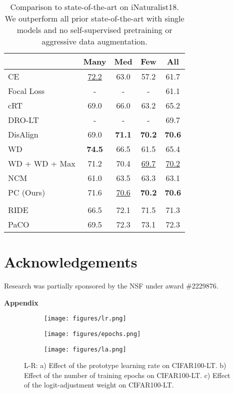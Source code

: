 \documentclass{article}
\begin{document}
\begin{table}[h!]
  \centering
  \begin{tabular}{l c c c c }
    \toprule
      & Many & Med & Few & All \\
    \midrule
    CE & \underline{72.2} & 63.0 & 57.2 & 61.7 \\
    Focal Loss  & - & - & - & 61.1 \\
    cRT  & 69.0 & 66.0 & 63.2 & 65.2 \\
    DRO-LT  & - & - & - & 69.7 \\
    DisAlign & 69.0 & \textbf{71.1} & \textbf{70.2} & \textbf{70.6} \\
    WD & \textbf{74.5} & 66.5 & 61.5 & 65.4 \\
    WD + WD + Max  & 71.2 & 70.4 & \underline{69.7} & \underline{70.2} \\
    \midrule
    NCM & 61.0 & 63.5 & 63.3 & 63.1 \\
    PC (Ours) & 71.6 & \underline{70.6} & \textbf{70.2} & \textbf{70.6} \\
    \midrule
    \rowcolor{lightgray} \multicolumn{5}{c}{SOTA with ``bells and whistles"} \\
    RIDE  & 66.5 & 72.1 & 71.5 & 71.3 \\
    PaCO  & 69.5 & 72.3 & 73.1 & 72.3 \\
    \bottomrule
  \end{tabular}
    \caption{Comparison to state-of-the-art on iNaturalist18. We outperform all prior state-of-the-art with single models and no self-supervised pretraining or aggressive data augmentation.}
    \label{tab:table 6}
\end{table}

\section*{Acknowledgements}
Research was partially sponsored by the NSF under award \#2229876.





\clearpage
\appendix

\Large{\textbf{Appendix}}

\begin{figure*}[!ht]
    \centering
    \begin{subfigure}[t]{0.33\textwidth}
        \texttt{[image: figures/lr.png]}
        \caption{}
        \label{fig:4a}
        \end{subfigure}
      \begin{subfigure}[t]{0.33\textwidth}
        \texttt{[image: figures/epochs.png]}
        \caption{}
        \label{fig:4b}
        \end{subfigure}
      \begin{subfigure}[t]{0.33\textwidth}
        \texttt{[image: figures/la.png]}
        \caption{}
        \label{fig:4c}
        \end{subfigure}
   \caption{L-R: a) Effect of the prototype learning rate on CIFAR100-LT. b) Effect of the number of training epochs on CIFAR100-LT. c) Effect of the logit-adjustment weight  on CIFAR100-LT.} 
\end{figure*}
\end{document}
